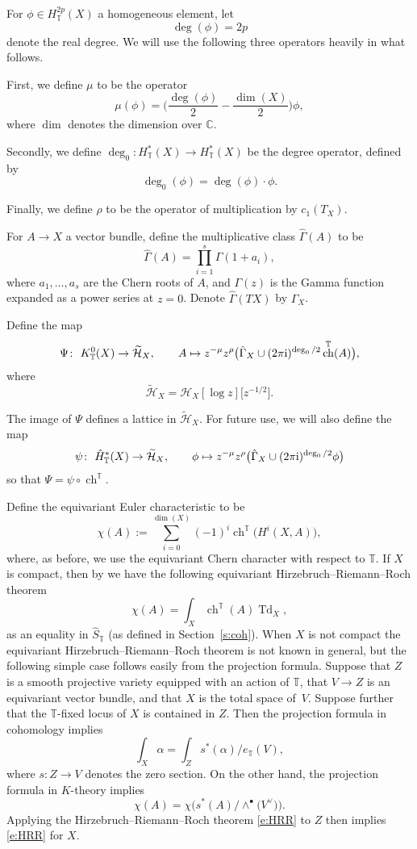 \documentclass[pdftex]{sigma}
\numberwithin{equation}{section}
\newcommand{\cc}[1]{\mathcal{#1}} %
\newcommand{\CC}{\mathbb{C}}
\newcommand{\torus}{\mathbb{T}}
\DeclareMathOperator{\ch}{ch}
\newcommand{\op}[1]{\operatorname{#1}}
\begin{document}
For $\phi \in H^{2p}_\torus(X)$ a homogeneous element, let
\[
\deg(\phi) = 2p
\]
denote the real degree.
We will use the following three operators heavily in what follows.

First, we define $\mu$ to be the operator
\[
\mu(\phi) = \biggl(\frac{\deg(\phi)}{2} - \frac{\dim(X)}{2}\biggr)\phi,
\]
where $\dim$ denotes the dimension over $\CC$.

Secondly, we define $\deg_0\colon H^*_\torus(X) \to H^*_\torus(X)$ be the degree operator, defined by
\[
\deg_0(\phi) = \deg(\phi)\cdot \phi.
\]


Finally, we define $\rho$ to be the operator of multiplication by $c_1(T_X)$.

For $A \to X$ a vector bundle, define the multiplicative class $\hat \Gamma(A)$ to be
\[
\hat \Gamma(A) = \prod_{i=1}^s \Gamma(1 + a_i),
\]
where $a_1, \dots, a_s$ are the Chern roots of $A$, and $\Gamma(z)$ is the Gamma function expanded as a power series at $z = 0$. Denote $\hat \Gamma(TX)$ by $\hat \Gamma_{X}$.

Define the map
\begin{align*}
\Psi\colon \ K^0_\torus(X) \to \widetilde{\cc H}_X, \qquad
A \mapsto z^{- \mu} z^{\rho} \bigl( \hat \Gamma_X \cup (2 \pi {\rm i})^{\op{deg}_0/2} \ch^\torus(A) \bigr),
\end{align*}
where
\[
\widetilde{\cc H}_X = \cc H_X[\log z]\big[z^{-1/2}\big].
\]

The image of $\Psi$ defines a lattice in $\widetilde{\cc H}_X$. For future use, we will also define the map
\begin{align}
\psi\colon \ \hat H^*_\torus(X) \to \widetilde{\cc H}_X, \qquad
\phi \mapsto z^{- \mu} z^{\rho} \bigl( \hat \Gamma_X \cup (2 \pi {\rm i})^{\op{deg}_0/2} \phi \bigr)\label{psi}
\end{align}
so that $\Psi = \psi \circ \ch^\torus$.

Define the equivariant Euler characteristic to be
\[
\chi(A) := \sum_{i=0}^{\dim(X)} (-1)^i \ch^\torus\bigl(H^i(X, A)\bigr),
\]
where, as before, we use the equivariant Chern character with respect to $\torus$.
If $X$ is compact, then by \cite{EG, Thomason} we have the following equivariant Hirzebruch--Riemann--Roch theorem
\begin{equation}\label{e:HRR}\chi(A) = \int_X \ch^\torus(A) \op{Td}_X,\end{equation}
as an equality in $\hat S_\torus$ (as defined in Section~\ref{s:coh}).
 When $X$ is not compact the equivariant Hirzebruch--Riemann--Roch theorem is not known in general, but the following simple case follows easily from the projection formula.
Suppose that $Z$ is a smooth projective variety equipped with an action of $\torus$, that $V \to Z$ is an equivariant vector bundle, and that $X$ is the total space of~$V$. Suppose further that the $\torus$-fixed locus of $X$ is contained in $Z$.
Then the projection formula in cohomology implies
\[
\int_X \alpha = \int_Z s^*(\alpha)/e_\torus(V),
\]
where $s\colon Z \to V$ denotes the zero section.
On the other hand, the projection formula in $K$-theory implies
\[
\chi(A) = \chi\bigl(s^*(A)/\wedge^\bullet\bigl(V^\vee\bigr)\bigr).
\]
Applying the Hirzebruch--Riemann--Roch theorem \eqref{e:HRR} to $Z$ then implies \eqref{e:HRR} for $X$.
\end{document}

